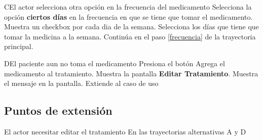 \begin{UCtrayectoriaA}{C}{El actor selecciona otra opción en la frecuencia del medicamento}
	\UCpaso [\UCactor] Selecciona la opción \textbf{ciertos días} en la frecuencia en que se tiene que tomar el medicamento.
	\UCpaso Muestra un checkbox por cada dia de la semana.
	\UCpaso [\UCactor] Selecciona los días que tiene que tomar la medicina a la semana.
	\UCpaso Continúa en el paso \ref{frecuencia} de la trayectoria principal.
\end{UCtrayectoriaA}

\begin{UCtrayectoriaA}{D}{El paciente aun no toma el medicamento}
	\UCpaso [\UCactor] Presiona el botón 
	\UCpaso Agrega el medicamento al tratamiento.
	\UCpaso Muestra la pantalla \textbf{Editar Tratamiento}.
	\UCpaso Muestra el mensaje  en la pantalla.
	\UCpaso Extiende al caso de uso 
\end{UCtrayectoriaA}



\subsection{Puntos de extensión}

\UCExtensionPoint
{El actor necesitar editar el tratamiento}
{En las trayectorias alternativas A y D}
{}